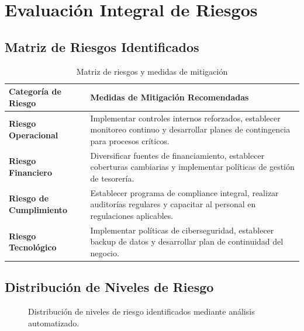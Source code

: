 \documentclass[11pt]{report}
\begin{document}
\chapter{Evaluación Integral de Riesgos}

\section{Matriz de Riesgos Identificados}
\begin{table}[H]
    \centering
    \begin{tabular}{p{}p{}}
        \toprule
        \textbf{Categoría de Riesgo} & \textbf{Medidas de Mitigación Recomendadas} \\
        \midrule
        \textbf{Riesgo Operacional} & 
        Implementar controles internos reforzados, establecer monitoreo continuo 
        y desarrollar planes de contingencia para procesos críticos. \\
        \hline
        \textbf{Riesgo Financiero} & 
        Diversificar fuentes de financiamiento, establecer coberturas cambiarias 
        y implementar políticas de gestión de tesorería. \\
        \hline
        \textbf{Riesgo de Cumplimiento} & 
        Establecer programa de compliance integral, realizar auditorías regulares 
        y capacitar al personal en regulaciones aplicables. \\
        \hline
        \textbf{Riesgo Tecnológico} & 
        Implementar políticas de ciberseguridad, establecer backup de datos 
        y desarrollar plan de continuidad del negocio. \\
        \bottomrule
    \end{tabular}
    \caption{Matriz de riesgos y medidas de mitigación}
\end{table}

\section{Distribución de Niveles de Riesgo}
\begin{figure}[H] 
    \centering
    \caption{Distribución de niveles de riesgo identificados mediante análisis automatizado.}
\end{figure}
\end{document}
